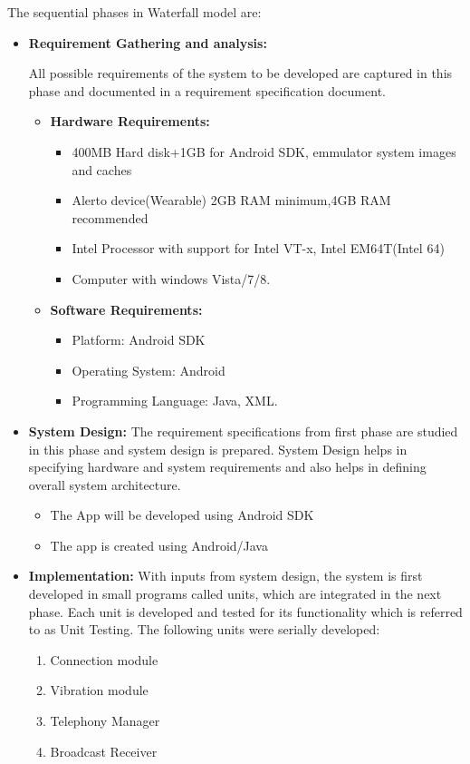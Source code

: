 \documentclass[12pt,a4paper]{report}
\begin{document}
The sequential phases in Waterfall model are: 
\begin{itemize}
\item \textbf{Requirement Gathering and analysis:}

 All possible requirements of the system to be developed are captured in this phase and documented in a requirement specification document.
\begin{itemize}
\item \textbf{Hardware Requirements:}
\begin{itemize}
\item 400MB Hard disk+1GB for Android SDK, emmulator system images and caches
\item Alerto device(Wearable)
2GB RAM minimum,4GB RAM recommended
\item Intel Processor with support for Intel VT-x, Intel EM64T(Intel 64)
\item Computer  with windows Vista/7/8.
\end{itemize}
\item \textbf{Software Requirements:}
\begin{itemize}
\item Platform: Android SDK
\item Operating System: Android
\item Programming Language: Java, XML.
\end{itemize}
\end{itemize}
\item \textbf{System Design:} The requirement specifications from first phase are studied in this phase and system design is prepared. System Design helps in specifying hardware and system requirements and also helps in defining overall system architecture.
\begin{itemize}
\item The App will be developed using Android SDK
\item The app is created using Android/Java
\end{itemize}
\item \textbf{Implementation:} With inputs from system design, the system is first developed in small programs called units, which are integrated in the next phase. Each unit is developed and tested for its functionality which is referred to as Unit Testing.
The following units were serially developed:
\begin{enumerate}
\item Connection module
\item Vibration module
\item Telephony Manager
\item Broadcast Receiver
\end{enumerate}


\end{itemize}
\end{document}
